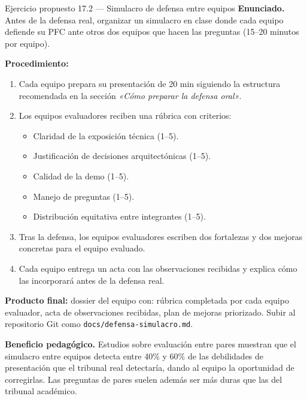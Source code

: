 \begin{cajaejercicio}{Ejercicio propuesto 17.2 --- Simulacro de defensa entre equipos}
\textbf{Enunciado.} Antes de la defensa real, organizar un simulacro
en clase donde cada equipo defiende su PFC ante otros dos equipos que
hacen las preguntas (15--20 minutos por equipo).

\textbf{Procedimiento:}
\begin{enumerate}
\item Cada equipo prepara su presentación de 20 min siguiendo la
estructura recomendada en la sección \emph{«Cómo preparar la defensa
oral»}.
\item Los equipos evaluadores reciben una rúbrica con criterios:
\begin{itemize}
\item Claridad de la exposición técnica (1--5).
\item Justificación de decisiones arquitectónicas (1--5).
\item Calidad de la demo (1--5).
\item Manejo de preguntas (1--5).
\item Distribución equitativa entre integrantes (1--5).
\end{itemize}
\item Tras la defensa, los equipos evaluadores escriben dos
fortalezas y dos mejoras concretas para el equipo evaluado.
\item Cada equipo entrega un acta con las observaciones recibidas y
explica cómo las incorporará antes de la defensa real.
\end{enumerate}

\textbf{Producto final:} dossier del equipo con: rúbrica completada
por cada equipo evaluador, acta de observaciones recibidas, plan de
mejoras priorizado. Subir al repositorio Git como
\texttt{docs/defensa-simulacro.md}.

\textbf{Beneficio pedagógico.} Estudios sobre evaluación entre pares
\cite{washizaki2024swebok} muestran que el simulacro entre equipos
detecta entre 40\% y 60\% de las debilidades de presentación que el
tribunal real detectaría, dando al equipo la oportunidad de
corregirlas. Las preguntas de pares suelen además ser más duras que
las del tribunal académico.
\end{cajaejercicio}

